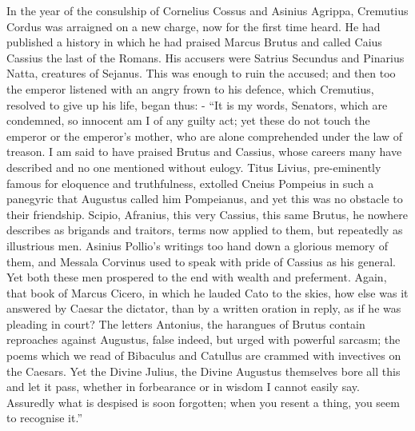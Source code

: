 
In the year of the consulship of Cornelius Cossus and Asinius Agrippa, Cremutius Cordus was arraigned on a new charge, now for the first time heard. He had published a history in which he had praised Marcus Brutus and called Caius Cassius the last of the Romans. His accusers were Satrius Secundus and Pinarius Natta, creatures of Sejanus. This was enough to ruin the accused; and then too the emperor listened with an angry frown to his defence, which Cremutius, resolved to give up his life, began thus: - ``It is my words, Senators, which are condemned, so innocent am I of any guilty act; yet these do not touch the emperor or the emperor's mother, who are alone comprehended under the law of treason. I am said to have praised Brutus and Cassius, whose careers many have described and no one mentioned without eulogy. Titus Livius, pre-eminently famous for eloquence and truthfulness, extolled Cneius Pompeius in such a panegyric that Augustus called him Pompeianus, and yet this was no obstacle to their friendship. Scipio, Afranius, this very Cassius, this same Brutus, he nowhere describes as brigands and traitors, terms now applied to them, but repeatedly as illustrious men. Asinius Pollio's writings too hand down a glorious memory of them, and Messala Corvinus used to speak with pride of Cassius as his general. Yet both these men prospered to the end with wealth and preferment. Again, that book of Marcus Cicero, in which he lauded Cato to the skies, how else was it answered by Caesar the dictator, than by a written oration in reply, as if he was pleading in court? The letters Antonius, the harangues of Brutus contain reproaches against Augustus, false indeed, but urged with powerful sarcasm; the poems which we read of Bibaculus and Catullus are crammed with invectives on the Caesars. Yet the Divine Julius, the Divine Augustus themselves bore all this and let it pass, whether in forbearance or in wisdom I cannot easily say. Assuredly what is despised is soon forgotten; when you resent a thing, you seem to recognise it.''


